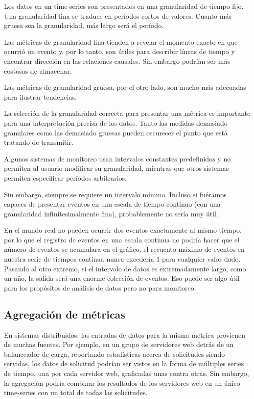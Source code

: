 Los datos en un time-series son presentados en una granularidad de tiempo fijo. Una granularidad fina se traduce en períodos cortos de valores. Cuanto más gruesa sea la granularidad, más largo será el período.

Las métricas de granularidad fina tienden a revelar el momento exacto en que ocurrió un evento y, por lo tanto, son útiles para describir líneas de tiempo y encontrar dirección en las relaciones causales. Sin embargo podrían ser más costosas de almacenar. 

Las métricas de granularidad gruesa, por el otro lado, son mucho más adecuadas para ilustrar tendencias.

La selección de la granularidad correcta para presentar una métrica es importante para una interpretación precisa de los datos. Tanto las medidas demasiado granulares como las demasiado gruesas pueden oscurecer el punto que está tratando de transmitir.

Algunos sistemas de monitoreo usan intervalos constantes predefinidos y no permiten al usuario modificar su granularidad, mientras que otros sistemas permiten especificar períodos arbitrarios. 

Sin embargo, siempre se requiere un intervalo mínimo. Incluso si fuéramos capaces de presentar eventos en una escala de tiempo continuo (con una granularidad infinitesimalmente fina), probablemente no sería muy útil.

En el mundo real no pueden ocurrir dos eventos exactamente al mismo tiempo, por lo que el registro de eventos en una escala continua no podría hacer que el número de eventos se acumulara en el gráfico. el recuento máximo de eventos en nuestra serie de tiempos continua nunca excedería 1 para cualquier valor dado. Pasando al otro extremo, si el intervalo de datos es extremadamente largo, como un año, la salida será una enorme colección de eventos. Eso puede ser algo útil para los propósitos de análisis de datos pero no para monitoreo.

\subsection*{Agregación de métricas}
\label{agregacion_de_metricas}

En sistemas distribuidos, las entradas de datos para la misma métrica provienen de muchas fuentes. Por ejemplo, en un grupo de servidores web detrás de un balanceador de carga, reportando estadísticas acerca de solicitudes siendo servidas, los datos de solicitud podrían ser vistos en la forma de múltiples series de tiempo, una por cada servidor web, graficadas unas contra otras. Sin embargo, la agregación podría combinar los resultados de los servidores web en un único time-series con un total de todas las solicitudes.

